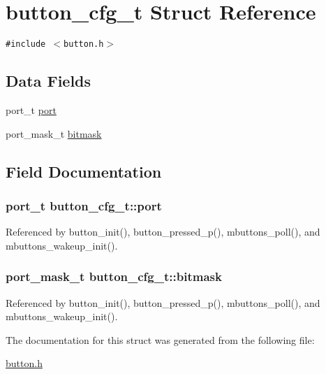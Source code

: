 \hypertarget{structbutton__cfg__t}{
\section{button\_\-cfg\_\-t Struct Reference}
\label{structbutton__cfg__t}
}
{\tt \#include $<$button.h$>$}

\subsection*{Data Fields}
\begin{CompactItemize}
\item 
port\_\-t \hyperlink{structbutton__cfg__t_e48d3a8bbeb68e840eddbe594be4bf87}{port}
\item 
port\_\-mask\_\-t \hyperlink{structbutton__cfg__t_cafdde2752d9e49666fab8f7d27646cb}{bitmask}
\end{CompactItemize}


\subsection{Field Documentation}
\hypertarget{structbutton__cfg__t_e48d3a8bbeb68e840eddbe594be4bf87}{
\subsubsection{\setlength{\rightskip}{0pt plus 5cm}port\_\-t {\bf button\_\-cfg\_\-t::port}}}
\label{structbutton__cfg__t_e48d3a8bbeb68e840eddbe594be4bf87}




Referenced by button\_\-init(), button\_\-pressed\_\-p(), mbuttons\_\-poll(), and mbuttons\_\-wakeup\_\-init().\hypertarget{structbutton__cfg__t_cafdde2752d9e49666fab8f7d27646cb}{
\subsubsection{\setlength{\rightskip}{0pt plus 5cm}port\_\-mask\_\-t {\bf button\_\-cfg\_\-t::bitmask}}}
\label{structbutton__cfg__t_cafdde2752d9e49666fab8f7d27646cb}




Referenced by button\_\-init(), button\_\-pressed\_\-p(), mbuttons\_\-poll(), and mbuttons\_\-wakeup\_\-init().

The documentation for this struct was generated from the following file:\begin{CompactItemize}
\item 
\hyperlink{button_8h}{button.h}\end{CompactItemize}
